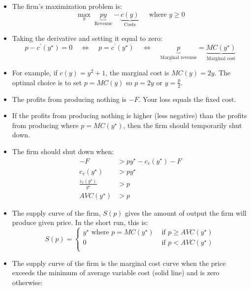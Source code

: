 \documentclass{article}
\begin{document}
\begin{itemize}
  \item The firm's maximization problem is:
    \[
    \underset{y}{\max}\; \underbrace{py}_{\text{Revenue}} - \underbrace{
    c\left( y \right)}_{\text{Costs}}\;\;\;\; \text{ where }y\geq 0
    \]
  \item Taking the derivative and setting it equal to zero:
    \[
      p - c^\prime\left( y^\star \right) = 0 \;\;\;\;\Longleftrightarrow\;\;\;\;
      p = c^\prime\left( y^\star \right) \;\;\;\;\Longleftrightarrow\;\;\;\;
      \underbrace{p}_{\text{Marginal revenue}} = \underbrace{MC\left( y^\star
      \right)}_{\text{Marginal cost}}
    \]
  \item For example, if $c\left( y \right)=y^2+1$, the marginal cost is $MC\left( y \right)=2y$. The optimal choice is to set $p=MC\left( y \right)$ so $p=2y$ or $y=\frac{p}{2}$.
  \item The profits from producing nothing is $-F$. Your loss equals the fixed cost.
  \item If the profits from producing nothing is higher (less negative) than the profits from producing where $p=MC\left( y^\star \right)$, then the firm should temporarily shut down.
  \item The firm should shut down when:
    \begin{align*}
      -F &> py^\star - c_v\left( y^\star \right)-F \\
      c_v\left( y^\star \right) &> py^\star  \\
      \frac{c_v\left( y^\star \right)}{y^\star} &> p \\
      AVC\left( y^\star \right) &> p
    \end{align*}
  \item The supply curve of the firm, $S\left( p \right)$ gives the amount of
    output the firm will produce given price. In the short run, this is:
    \[
      S\left( p \right)=
      \begin{cases}
        y^\star \text{ where } p=MC\left( y^\star \right) & \text{ if } p\geq
        AVC\left( y^\star \right) \\
        0 & \text{ if } p<
        AVC\left( y^\star \right) \\
      \end{cases}
    \]
\end{itemize}
\begin{itemize}
  \item The supply curve of the firm is the marginal cost curve when the price exceeds the minimum of average variable cost (solid line) and is zero otherwise:
\end{itemize}
\end{document}
